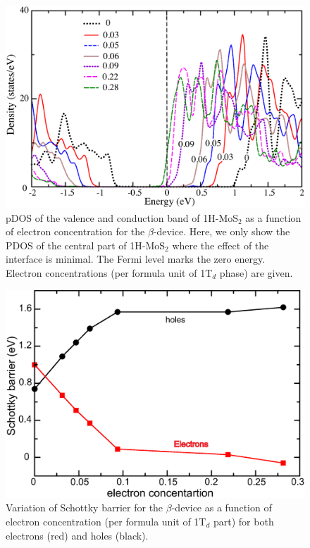 \begin{figure}[htb]
\centering
\includegraphics[width=0.8\linewidth]{dos-charge.eps}
\caption{pDOS of the valence and conduction band of 1H-MoS$_2$ as a function of electron concentration for the $\beta$-device. Here, we only show the PDOS of the central part of 1H-MoS$_2$ where the effect of the interface is minimal.  The Fermi level marks the zero energy. Electron concentrations (per formula unit of 1T$_d$ phase) are given. \label{sch-elec}}
\end{figure}

\begin{figure}[htb]
\centering
\includegraphics[width=0.7\linewidth]{Schottky-Charge.eps}
\caption{\label{sch-chg}Variation of Schottky barrier for the $\beta$-device as a function of electron concentration (per formula unit of 1T$_d$ part) for both electrons (red) and holes (black).}
\end{figure}

